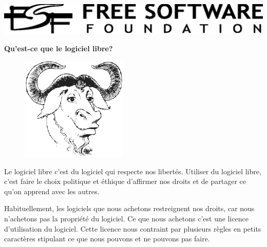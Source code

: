 \documentclass[twoside,12pt]{article}
\begin{document}
\begin{center}

\includegraphics{fsf-logo.eps}

\vspace{0.3in}

{\Huge\bf Qu'est-ce que le logiciel libre?}

\end{center}

\begin{figure}
 \begin{center}
   \includegraphics[width=2in]{gnu-head.eps}
 \end{center}
\end{figure}

Le logiciel libre c'est du logiciel qui respecte nos libertés. Utiliser du
logiciel libre, c'est faire le choix politique et éthique d'affirmer nos droits
et de partager ce qu'on apprend avec les autres.


Habituellement, les logiciels que nous achetons restreignent nos droits, car
nous n'achetons pas la propriété du logiciel. Ce que nous achetons c'est une
licence d'utilisation du logiciel. Cette licence nous contraint par plusieurs
règles en petits caractères stipulant ce que nous pouvons et ne pouvons pas
faire.

\end{document}
